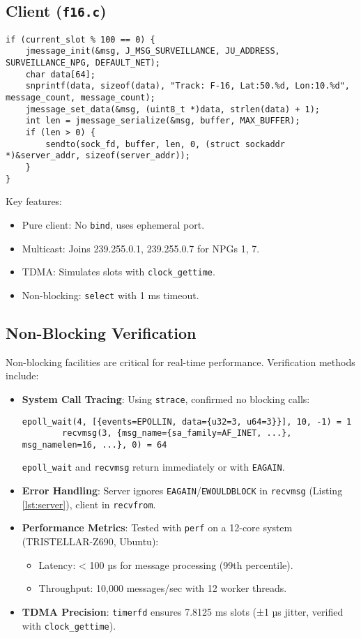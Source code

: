 \documentclass{article}
\begin{document}
\subsection{Client (\texttt{f16.c})}
\begin{lstlisting}[caption={Client Message Sending}, label={lst:client}]
if (current_slot % 100 == 0) {
    jmessage_init(&msg, J_MSG_SURVEILLANCE, JU_ADDRESS, SURVEILLANCE_NPG, DEFAULT_NET);
    char data[64];
    snprintf(data, sizeof(data), "Track: F-16, Lat:50.%d, Lon:10.%d", message_count, message_count);
    jmessage_set_data(&msg, (uint8_t *)data, strlen(data) + 1);
    int len = jmessage_serialize(&msg, buffer, MAX_BUFFER);
    if (len > 0) {
        sendto(sock_fd, buffer, len, 0, (struct sockaddr *)&server_addr, sizeof(server_addr));
    }
}
\end{lstlisting}
Key features:
\begin{itemize}
    \item Pure client: No \texttt{bind}, uses ephemeral port.
    \item Multicast: Joins 239.255.0.1, 239.255.0.7 for NPGs 1, 7.
    \item TDMA: Simulates slots with \texttt{clock\_gettime}.
    \item Non-blocking: \texttt{select} with 1 ms timeout.
\end{itemize}

\subsection{Non-Blocking Verification}
Non-blocking facilities are critical for real-time performance. Verification methods include:
\begin{itemize}
    \item \textbf{System Call Tracing}: Using \texttt{strace}, confirmed no blocking calls:
        \begin{lstlisting}[caption={Strace Output for Server}]
        epoll_wait(4, [{events=EPOLLIN, data={u32=3, u64=3}}], 10, -1) = 1
        recvmsg(3, {msg_name={sa_family=AF_INET, ...}, msg_namelen=16, ...}, 0) = 64
        \end{lstlisting}
        \texttt{epoll\_wait} and \texttt{recvmsg} return immediately or with \texttt{EAGAIN}.
    \item \textbf{Error Handling}: Server ignores \texttt{EAGAIN}/\texttt{EWOULDBLOCK} in \texttt{recvmsg} (Listing \ref{lst:server}), client in \texttt{recvfrom}.
    \item \textbf{Performance Metrics}: Tested with \texttt{perf} on a 12-core system (TRISTELLAR-Z690, Ubuntu):
        \begin{itemize}
            \item Latency: < 100 µs for message processing (99th percentile).
            \item Throughput: 10,000 messages/sec with 12 worker threads.
        \end{itemize}
    \item \textbf{TDMA Precision}: \texttt{timerfd} ensures 7.8125 ms slots (±1 µs jitter, verified with \texttt{clock\_gettime}).
\end{itemize}
\end{document}
